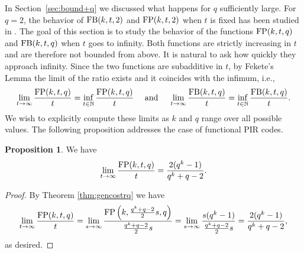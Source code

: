 \documentclass[11pt,a4paper]{article}
\theoremstyle{definition}
\newtheorem{proposition}[theorem]{Proposition}
\newcommand{\N}{\mathbb N}
\newcommand{\fb}{\textnormal{FB}}
\newcommand{\fp}{\textnormal{FP}}
\begin{document}
In Section~\ref{sec:bound+q} we discussed what happens for $q$ sufficiently large. For $q=2$, the behavior of $\fb(k,t,2)$ and $\fp(k,t,2)$ when $t$ is fixed has been studied in \cite{zhang2020bounds}. The goal of this section is to study the behavior of the functions $\fp(k,t,q)$ and $\fb(k,t,q)$ when $t$ goes to infinity. Both functions are strictly increasing in $t$ and are therefore not bounded from above. It is natural to ask
how quickly they approach infinity. Since the two functions are subadditive in $t$, by Fekete's Lemma the limit of the ratio exists and it coincides with the infimum, i.e.,
\begin{equation*}
    \lim_{t\to\infty} \frac{\fp(k,t,q)}{t}=\inf_{t\in\N}\frac{\fp(k,t,q)}{t}\quad\text{ and }\quad\lim_{t\to\infty} \frac{\fb(k,t,q)}{t}=\inf_{t\in\N}\frac{\fb(k,t,q)}{t}.
\end{equation*}
We wish to explicitly compute these limits as $k$ and $q$ range over all possible values. The following proposition addresses the case of functional PIR codes.
\begin{proposition}\label{proposition:limfpq}
We have
    \begin{equation*}        \lim_{t\to\infty}\frac{\fp(k,t,q)}{t}=\frac{2(q^{k}-1)}{q^k+q-2}.
    \end{equation*}
\end{proposition}
\begin{proof}
    By Theorem \ref{thm:gencostrq} we have
    \begin{equation*}        \lim_{t\to\infty}\frac{\fp(k,t,q)}{t}=\lim_{s\to\infty}\frac{\fp\left(k,\frac{q^k+q-2}{2}s,q\right)}{\frac{q^k+q-2}{2}s}=\lim_{s\to\infty}\frac{s(q^k-1)}{\frac{q^k+q-2}{2}s}=\frac{2(q^k-1)}{q^k+q-2},
    \end{equation*}
    as desired.
\end{proof}
\end{document}
